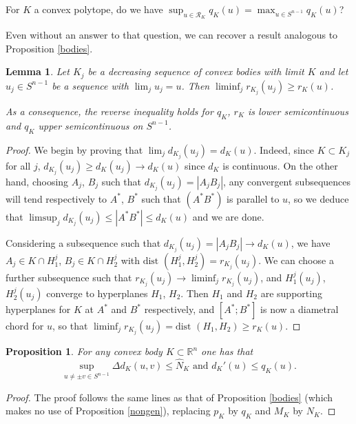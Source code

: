 \documentclass[a4paper,12pt]{amsart}
\newtheorem{prop}[thm]{Proposition}
\newtheorem{lemma}[thm]{Lemma}
\def\R{\mathbb R}
\begin{document}
For $K$  a convex polytope, do we have
$\sup_{u\in \mathcal R_K}q_K(u) = \max_{u\in S^{n-1}}q_K(u)$?
\smallskip

Even without an answer to that question, we can recover a result analogous to Proposition \ref{bodies}.

\begin{lemma}
\label{qlsc}
Let $K_j$ be a decreasing sequence of convex bodies
with limit $K$ and let $u_j \in S^{n-1}$ be a sequence with
$\lim_j u_j = u$. Then $\liminf_j r_{K_j} (u_j) \ge r_K(u)$.

As a consequence, the reverse inequality holds for $q_K$,
$r_K$ is lower semicontinuous and $q_K$ upper semicontinuous on $S^{n-1}$.
\end{lemma}

\begin{proof}
We begin by proving that $\lim_j d_{K_j} (u_j)= d_{K} (u)$.  Indeed, since $K\subset K_j$
for all $j$, $d_{K_j} (u_j) \ge d_{K} (u_j) \to d_K(u)$  since $d_K$
is continuous. On the other hand, choosing $A_j$, $B_j$ such that $d_{K_j} (u_j) = |A_j B_j|$,
any convergent subsequences will tend respectively to $A^*$, $B^*$ such that
$(A^*B^*)$ is parallel to $u$, so we deduce that $\limsup_j d_{K_j} (u_j) \le |A^*B^*|\le
d_K(u)$ and we are done.

Considering  a subsequence such that $d_{K_j} (u_j) = |A_j B_j|\to d_K(u)$, we have
$A_j \in K\cap H^j_1$, $B_j \in K\cap H^j_2$ with $\mbox{dist }(H^j_1,H^j_2)= r_{K_j} (u_j)$.
We can choose a further subsequence
such that $r_{K_j} (u_j)\to \liminf_j r_{K_j} (u_j)$, and $H^j_1(u_j)$,
$H^j_2(u_j)$ converge to hyperplanes $H_1$, $H_2$. Then $H_1$ and $H_2$ are
supporting hyperplanes for $K$ at $A^*$ and $B^*$ respectively, and $[A^*;B^*]$
is now a diametral chord for $u$,
so that $\liminf_j r_{K_j} (u_j)=\mbox{dist }(H_1,H_2) \ge r_K(u)$.
\end{proof}

\begin{prop}
\label{dbodies}
For any convex body $K\subset \R^n$ one has that
$$
\sup_{u\neq \pm v \in S^{n-1} } \Delta d_K(u,v) \le \hat N_K\mbox{\ \ and\ \ }d_K'(u)\le q_K(u).
$$
\end{prop}

\begin{proof}
The proof follows the same lines as that of Proposition \ref{bodies} (which
makes no use of Proposition \ref{nongen}), replacing $p_K$ by $q_K$ and $M_K$ by $N_K$.
\end{proof}
\end{document}
